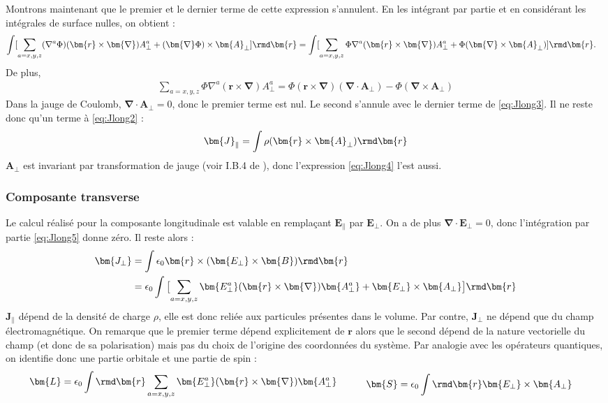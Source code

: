 Montrons maintenant que le premier et le dernier terme de cette expression s'annulent. En les intégrant par partie et en considérant les intégrales de surface nulles, on obtient :
\begin{align}
\int[\sum_{a=x,y,z}(\nabla^a\Phi)(\bm{r}\times\bm{\nabla})A^a_{\bot}+(\bm{\nabla}\Phi)\times\bm{A}_{\bot}]\rmd\bm{r}
&=\int[\sum_{a=x,y,z}\Phi\nabla^a(\bm{r}\times\bm{\nabla})A^a_{\bot}+\Phi(\bm{\nabla}\times\bm{A}_{\bot})]\rmd\bm{r}.
\label{eq:Jlong3}
\end{align}
De plus,
\begin{align*}
\sum_{a=x,y,z}\Phi\nabla^a(\bm{r}\times\bm{\nabla})A^a_{\bot}=\Phi(\bm{r}\times\bm{\nabla})(\bm{\nabla}\cdot\bm{A}_{\bot})-\Phi(\bm{\nabla}\times\bm{A}_{\bot})
\end{align*}
Dans la jauge de Coulomb, $\bm{\nabla}\cdot\bm{A}_{\bot}=0$, donc le premier terme est nul. Le second s'annule avec le dernier terme de \ref{eq:Jlong3}. Il ne reste donc qu'un terme à \ref{eq:Jlong2} :
\begin{equation}
\bm{J}_{\parallel}=\int{\rho(\bm{r}\times\bm{A}_{\bot})\rmd\bm{r}}
\label{eq:Jlong4}
\end{equation}
$\bm{A}_{\bot}$ est invariant par transformation de jauge (voir I.B.4 de ), donc l'expression \ref{eq:Jlong4} l'est aussi.

\subsubsection{Composante transverse}
Le calcul réalisé pour la composante longitudinale est valable en remplaçant $\bm{E}_{\parallel}$ par $\bm{E}_{\bot}$. On a de plus $\bm{\nabla}\cdot\bm{E}_{\bot}=0$, donc l'intégration par partie \ref{eq:Jlong5} donne zéro. Il reste alors :
\begin{align*}
\bm{J_{\bot}}&=\int{\epsilon_0\bm{r}\times(\bm{E_{\bot}}\times\bm{B})\rmd\bm{r}}\nonumber\\
&=\epsilon_0\int{\bigl[\sum_{a=x,y,z} \bm{E^a_{\bot}}(\bm{r}\times\bm{\nabla})\bm{A^a_{\bot}}+\bm{E_{\bot}}\times\bm{A_{\bot}}\bigr]\rmd\bm{r}}
\label{eq:Jtran}
\end{align*}
$\bm{J_{\parallel}}$ dépend de la densité de charge $\rho$, elle est donc reliée aux particules présentes dans le volume. Par contre, $\bm{J_{\bot}}$ ne dépend que du champ électromagnétique. On remarque que le premier terme dépend explicitement de $\bm{r}$ alors que le second dépend de la nature vectorielle du champ (et donc de sa polarisation) mais pas du choix de l'origine des coordonnées du système. Par analogie avec les opérateurs quantiques, on identifie donc une partie orbitale et une partie de spin :
\begin{equation}
\begin{aligned}[c]
\bm{L}&=\epsilon_0\int{\rmd\bm{r}\sum_{a=x,y,z} \bm{E^a_{\bot}}(\bm{r}\times\bm{\nabla})\bm{A^a_{\bot}}}
\end{aligned}
\qquad
\begin{aligned}[c]
\bm{S}&=\epsilon_0\int{\rmd\bm{r}\bm{E_{\bot}}\times\bm{A_{\bot}}}
\end{aligned}
\label{SeparationJS_classique}
\end{equation} 
 
